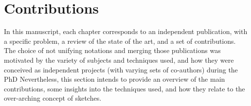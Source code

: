  \section{Contributions}\label{intro:sec:contrib}

In this manuscript, each chapter corresponds to an independent publication, with a specific problem, a review of the state of the art, and a set of contributions. The choice of not unifying notations and merging those publications was motivated by the variety of subjects and techniques used, and how they were conceived as independent projects (with varying sets of co-authors) during the PhD Nevertheless, this section intends to provide an overview of the main contributions, some insights into the techniques used, and how they relate to the over-arching concept of sketches.


